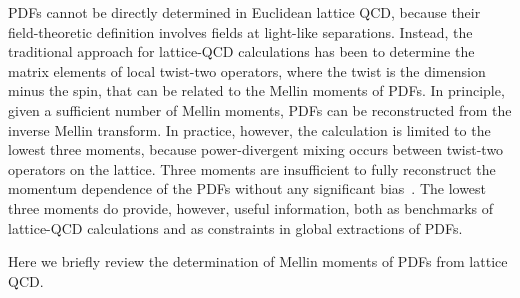 PDFs cannot be directly determined in Euclidean lattice QCD, because their 
field-theoretic definition involves fields at light-like separations.
%
Instead, the traditional approach for lattice-QCD calculations has been 
to determine the matrix elements of local twist-two operators, 
where the twist is the dimension minus the spin, that can be related to the 
Mellin moments of PDFs.
%
In principle, given a sufficient number of Mellin moments, PDFs can be 
reconstructed from the inverse Mellin transform. 
%
In practice, however, the calculation is limited to the lowest three moments, 
because power-divergent mixing occurs between twist-two operators on the 
lattice.
%
Three moments are insufficient to fully reconstruct the momentum dependence of 
the PDFs without any significant bias~\cite{Detmold:2003rq}.
%
The lowest three moments do provide, however, useful information, both as 
benchmarks of lattice-QCD calculations and as constraints in global 
extractions of PDFs. 

Here we briefly review the determination of Mellin moments of PDFs 
from lattice QCD. 

